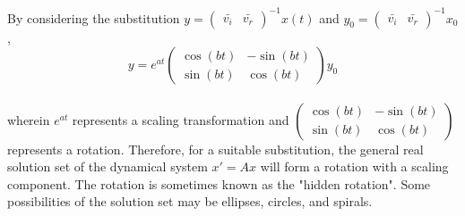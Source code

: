 \documentclass[a4paper, 12pt]{report}
\def\dst{\displaystyle}
\def\b{\bar}
\begin{document}
\begin{center}
By considering the substitution $\dst{y = \begin{pmatrix}\b{v_i} & \b{v_r} \end{pmatrix}^{-1}x(t)}$ and $\dst{y_0 = \begin{pmatrix}\b{v_i} & \b{v_r} \end{pmatrix}^{-1}  x_0}$,
$$y = e^{at} \begin{pmatrix} \cos{(bt)}& -\sin{(bt)} \\ \sin{(bt)}& \cos{(bt)} \end{pmatrix} y_0$$
\\wherein $e^{at}$ represents a scaling transformation and $\dst{\begin{pmatrix} \cos{(bt)}& -\sin{(bt)} \\ \sin{(bt)}& \cos{(bt)} \end{pmatrix}}$ represents a rotation. Therefore, for a suitable substitution, the general real solution set of the dynamical system $\dst{x' = Ax}$ will form a rotation with a scaling component. The rotation is sometimes known as the "hidden rotation". Some possibilities of the solution set may be ellipses, circles, and spirals. 

\end{center}
\end{document}
